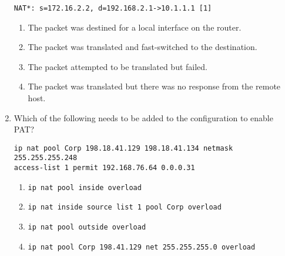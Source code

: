 \begin{enumerate}
\begin{verbatim}
NAT*: s=172.16.2.2, d=192.168.2.1->10.1.1.1 [1]
\end{verbatim}

  \begin{enumerate}
  \tightlist
  \item
    The packet was destined for a local interface on the router.
  \item
    The packet was translated and fast-switched to the destination.
  \item
    The packet attempted to be translated but failed.
  \item
    The packet was translated but there was no response from the remote
    host.
  \end{enumerate}
\item
  Which of the following needs to be added to the configuration to
  enable PAT?

\begin{verbatim}
ip nat pool Corp 198.18.41.129 198.18.41.134 netmask 255.255.255.248
access-list 1 permit 192.168.76.64 0.0.0.31
\end{verbatim}

  \begin{enumerate}
  \tightlist
  \item
    \texttt{ip\ nat\ pool\ inside\ overload}
  \item
    \texttt{ip\ nat\ inside\ source\ list\ 1\ pool\ Corp\ overload}
  \item
    \texttt{ip\ nat\ pool\ outside\ overload}
  \item
    \texttt{ip\ nat\ pool\ Corp\ 198.41.129\ net\ 255.255.255.0\ overload}
  \end{enumerate}
\end{enumerate}

